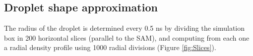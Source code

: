 \subsection{Droplet shape approximation}

The radius of the droplet is determined every 0.5 ns by dividing the
simulation box in 200 horizontal slices (parallel to the SAM), and
computing from each one a radial density profile using 1000 radial
divisions (Figure \ref{fig:Slices}).